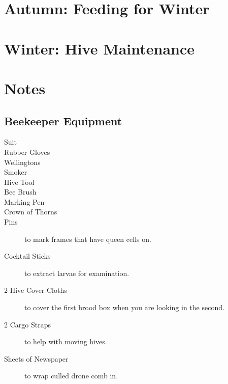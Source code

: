 \documentclass{./BeekeepingBook}
\begin{document}
\clearpage
\section{Autumn: Feeding for Winter}
\clearpage

\clearpage

\clearpage


\clearpage
\section{Winter: Hive Maintenance}
\clearpage

\clearpage

\clearpage


\clearpage
\section{Notes}

\subsection{Beekeeper Equipment}

\begin{description}
  \item[Suit]  
  \item[Rubber Gloves] 
  \item[Wellingtons] 
  \item[Smoker] 
  \item[Hive Tool] 
  \item[Bee Brush] 
  \item[Marking Pen]
  \item[Crown of Thorns]
  \item[Pins] to mark frames that have queen cells on.
  \item[Cocktail Sticks] to extract larvae for examination.
  \item[2 Hive Cover Cloths] to cover the first brood box when you are looking in the second.
  \item[2 Cargo Straps] to help with moving hives. 
  \item[Sheets of Newspaper] to wrap culled drone comb in.
\end{description}
\end{document}
